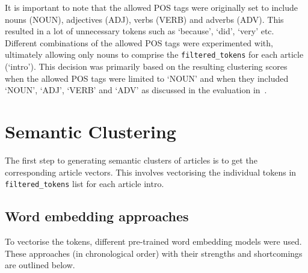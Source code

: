 It is important to note that the allowed POS tags were originally set to include nouns (NOUN), adjectives (ADJ), verbs (VERB) and adverbs (ADV). This resulted in a lot of unnecessary tokens such as `because', `did', `very' etc. Different combinations of the allowed POS tags were experimented with, ultimately allowing only nouns to comprise the \texttt{filtered\_tokens} for each article (`intro'). This decision was primarily based on the resulting clustering scores when the allowed POS tags were limited to `NOUN' and when they included `NOUN', `ADJ', `VERB' and `ADV' as discussed in the evaluation in~.

\section{Semantic Clustering} \label{s:semantic_clustering}

The first step to generating semantic clusters of articles is to get the corresponding article vectors. This involves vectorising the individual tokens in \texttt{filtered\_tokens} list for each article intro.

\subsection{Word embedding approaches} \label{word_embed_approaches}
To vectorise the tokens, different pre-trained word embedding models were used. These approaches (in chronological order) with their strengths and shortcomings are outlined below.

